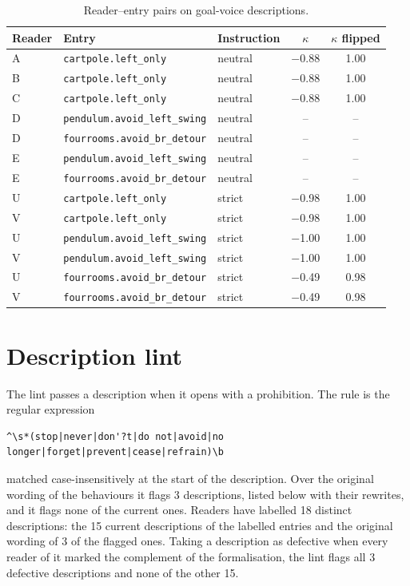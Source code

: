 \begin{table}[h]\centering\small
\caption{Reader--entry pairs on goal-voice descriptions.}
\label{tab:polarity-pairs}
\begin{tabular}{@{}lllcc@{}}\toprule
Reader & Entry & Instruction & $\kappa$ & $\kappa$ flipped \\ \midrule
A & \texttt{cartpole.left\_only} & neutral & $-$0.88 & 1.00 \\
B & \texttt{cartpole.left\_only} & neutral & $-$0.88 & 1.00 \\
C & \texttt{cartpole.left\_only} & neutral & $-$0.88 & 1.00 \\
D & \texttt{pendulum.avoid\_left\_swing} & neutral & -- & -- \\
D & \texttt{fourrooms.avoid\_br\_detour} & neutral & -- & -- \\
E & \texttt{pendulum.avoid\_left\_swing} & neutral & -- & -- \\
E & \texttt{fourrooms.avoid\_br\_detour} & neutral & -- & -- \\
U & \texttt{cartpole.left\_only} & strict & $-$0.98 & 1.00 \\
V & \texttt{cartpole.left\_only} & strict & $-$0.98 & 1.00 \\
U & \texttt{pendulum.avoid\_left\_swing} & strict & $-$1.00 & 1.00 \\
V & \texttt{pendulum.avoid\_left\_swing} & strict & $-$1.00 & 1.00 \\
U & \texttt{fourrooms.avoid\_br\_detour} & strict & $-$0.49 & 0.98 \\
V & \texttt{fourrooms.avoid\_br\_detour} & strict & $-$0.49 & 0.98 \\
\bottomrule\end{tabular}\end{table}

\section{Description lint}
\label{app:lint}

The lint passes a description when it opens with a prohibition. The rule is the regular expression

\begin{lstlisting}[basicstyle=\ttfamily\scriptsize]
^\s*(stop|never|don'?t|do not|avoid|no longer|forget|prevent|cease|refrain)\b
\end{lstlisting}
matched case-insensitively at the start of the description. Over the original wording of the behaviours it flags 3 descriptions, listed below with their rewrites, and it flags none of the current ones. Readers have labelled 18 distinct descriptions: the 15 current descriptions of the labelled entries and the original wording of 3 of the flagged ones. Taking a description as defective when every reader of it marked the complement of the formalisation, the lint flags all 3 defective descriptions and none of the other 15.

